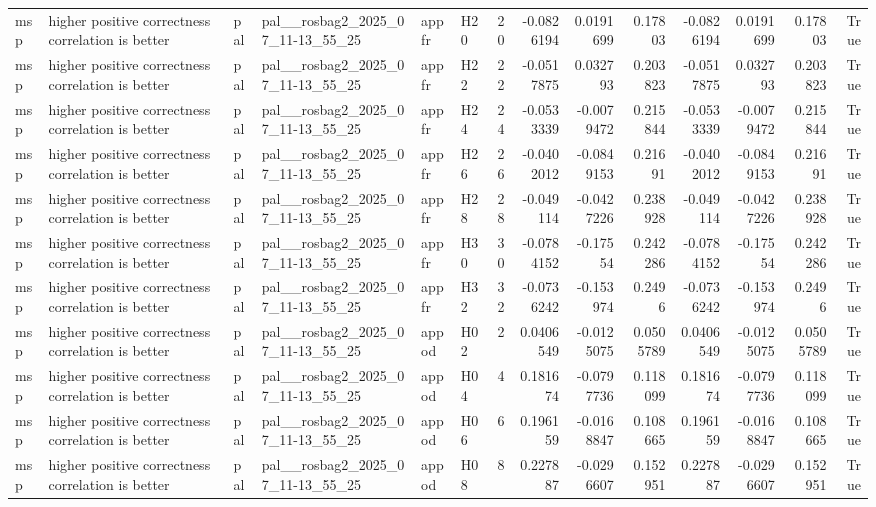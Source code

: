 \begin{longtable}{llllllrrrrrrrr}
msp & higher positive correctness correlation is better & pal & pal\_\_rosbag2\_2025\_07\_11-13\_55\_25 & appfr & H20 & 20 & -0.0826194 & 0.0191699 & 0.17803 & -0.0826194 & 0.0191699 & 0.17803 & True \\
msp & higher positive correctness correlation is better & pal & pal\_\_rosbag2\_2025\_07\_11-13\_55\_25 & appfr & H22 & 22 & -0.0517875 & 0.032793 & 0.203823 & -0.0517875 & 0.032793 & 0.203823 & True \\
msp & higher positive correctness correlation is better & pal & pal\_\_rosbag2\_2025\_07\_11-13\_55\_25 & appfr & H24 & 24 & -0.0533339 & -0.0079472 & 0.215844 & -0.0533339 & -0.0079472 & 0.215844 & True \\
msp & higher positive correctness correlation is better & pal & pal\_\_rosbag2\_2025\_07\_11-13\_55\_25 & appfr & H26 & 26 & -0.0402012 & -0.0849153 & 0.21691 & -0.0402012 & -0.0849153 & 0.21691 & True \\
msp & higher positive correctness correlation is better & pal & pal\_\_rosbag2\_2025\_07\_11-13\_55\_25 & appfr & H28 & 28 & -0.049114 & -0.0427226 & 0.238928 & -0.049114 & -0.0427226 & 0.238928 & True \\
msp & higher positive correctness correlation is better & pal & pal\_\_rosbag2\_2025\_07\_11-13\_55\_25 & appfr & H30 & 30 & -0.0784152 & -0.17554 & 0.242286 & -0.0784152 & -0.17554 & 0.242286 & True \\
msp & higher positive correctness correlation is better & pal & pal\_\_rosbag2\_2025\_07\_11-13\_55\_25 & appfr & H32 & 32 & -0.0736242 & -0.153974 & 0.2496 & -0.0736242 & -0.153974 & 0.2496 & True \\
msp & higher positive correctness correlation is better & pal & pal\_\_rosbag2\_2025\_07\_11-13\_55\_25 & appod & H02 & 2 & 0.0406549 & -0.0125075 & 0.0505789 & 0.0406549 & -0.0125075 & 0.0505789 & True \\
msp & higher positive correctness correlation is better & pal & pal\_\_rosbag2\_2025\_07\_11-13\_55\_25 & appod & H04 & 4 & 0.181674 & -0.0797736 & 0.118099 & 0.181674 & -0.0797736 & 0.118099 & True \\
msp & higher positive correctness correlation is better & pal & pal\_\_rosbag2\_2025\_07\_11-13\_55\_25 & appod & H06 & 6 & 0.196159 & -0.0168847 & 0.108665 & 0.196159 & -0.0168847 & 0.108665 & True \\
msp & higher positive correctness correlation is better & pal & pal\_\_rosbag2\_2025\_07\_11-13\_55\_25 & appod & H08 & 8 & 0.227887 & -0.0296607 & 0.152951 & 0.227887 & -0.0296607 & 0.152951 & True \\

\end{longtable}
